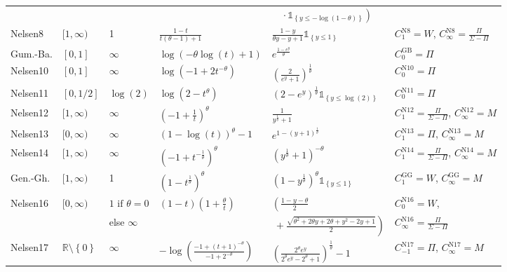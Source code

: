 \documentclass{article}
\def\1{\mathds{1}} %
\def\setof#1{\left\{#1\right\}} %
\newcommand{\R}{\mathbb{R}}
\begin{document}
\begin{table}[t!]
\begin{center}
{\begin{tabular}{llllll}
            & & & &$\left.\quad\cdot\1_{\setof{y\leq -\log(1-\theta)}}\right)$ & \\
            Nelsen8 & $[1,\infty)$ & 1 & $\frac{1 - t}{t \left(\theta - 1\right) + 1}$ & $\frac{1 - y}{\theta y - y + 1}\1_{\setof{y\leq 1}}$ & $C^{\text{N8}}_{1} = W$, $C^{\text{N8}}_{\infty} = \frac{\Pi}{\Sigma - \Pi}$ \\
            Gum.-Ba. & $[0,1]$ & $\infty$& $\log{\left(- \theta \log{\left(t \right)} + 1 \right)}$ & $e^{\frac{1 - e^{y}}{\theta}}$ & $C^{\text{GB}}_0 = \Pi$ \\
            Nelsen10 & $[0,1]$ & $\infty$&  $\log{\left(-1 + 2 t^{- \theta} \right)}$ &  $\left(\frac{2}{e^{y} + 1}\right)^{\frac{1}{\theta}}$ & $C^{\text{N10}}_0 = \Pi$ \\
            Nelsen11 &$[0,1/2]$ & $\log(2)$ & $\log{\left(2 - t^{\theta} \right)}$ & $\left(2 - e^{y}\right)^{\frac{1}{\theta}}\1_{\setof{y\leq\log(2)}}$ & $C^{\text{N11}}_0 = \Pi$ \\
            Nelsen12 & $[1,\infty)$ & $\infty$& $\left(-1 + \frac{1}{t}\right)^{\theta}$ & $\frac{1}{y^{\frac{1}{\theta}} + 1}$ & $C^{\text{N12}}_{1} = \frac{\Pi}{\Sigma - \Pi}$, $C^{\text{N12}}_{\infty} = M$ \\
            Nelsen13 & $[0,\infty)$ & $\infty$& $\left(1 - \log{\left(t \right)}\right)^{\theta} - 1$ &$e^{1 - \left(y + 1\right)^{\frac{1}{\theta}}}$ & $C^{\text{N13}}_{1} = \Pi$, $C^{\text{N13}}_{\infty} = M$  \\
            Nelsen14 & $[1,\infty)$ & $\infty$&    $\left(-1 + t^{- \frac{1}{\theta}}\right)^{\theta}$ &  $\left(y^{\frac{1}{\theta}} + 1\right)^{- \theta}$ & $C^{\text{N14}}_{1} = \frac{\Pi}{\Sigma - \Pi}$, $C^{\text{N14}}_{\infty} = M$  \\
            Gen.-Gh. &$[1,\infty)$ & 1 &  $\left(1 - t^{\frac{1}{\theta}}\right)^{\theta}$ &  $\left(1 - y^{\frac{1}{\theta}}\right)^{\theta}\1_{\setof{y\leq1}}$ &  $C^{\text{GG}}_{1} = W$, $C^{\text{GG}}_{\infty} = M$ \\
            Nelsen16 &$[0,\infty)$ & $1\text{ if }\theta = 0$ & $\left(1 - t\right) \left(1 + \frac{\theta}{t}\right)$ &  $\left(\frac{1 - y- \theta}{2} 
            \right.$ &  $C^{\text{N16}}_{0} = W$,  \\
            && else $\infty$ & & $\left.~ + \frac{\sqrt{\theta^{2} + 2 \theta y + 2 \theta + y^{2} - 2 y + 1}}{2}\right)$ & $C^{\text{N16}}_{\infty} = \frac{\Pi}{\Sigma - \Pi}$ \\
            Nelsen17 &$\R\setminus\setof{0}$ & $\infty$&  $- \log{\left(\frac{-1 + \left(t + 1\right)^{- \theta}}{-1 + 2^{- \theta}} \right)}$ &     $\left(\frac{2^{\theta} e^{y}}{2^{\theta} e^{y} - 2^{\theta} + 1}\right)^{\frac{1}{\theta}} - 1$ & $C^{\text{N17}}_{-1} = \Pi$, $C^{\text{N17}}_{\infty} = M$ \\

\end{tabular}}
\end{center}
\end{table}
\end{document}
